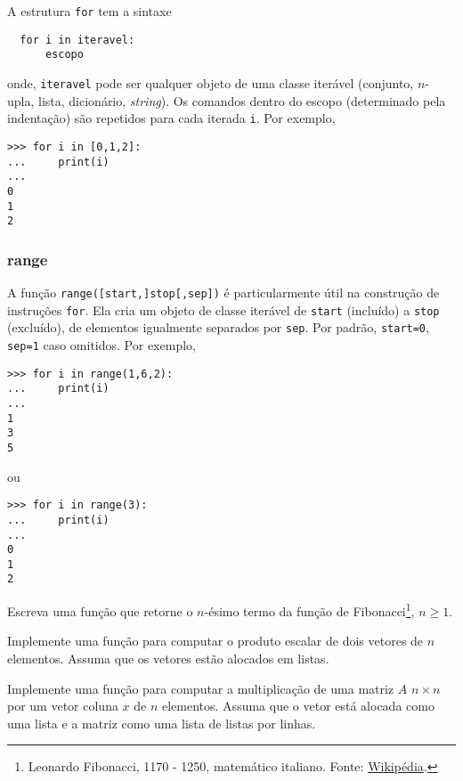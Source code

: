 \documentclass[12pt]{article}
\begin{document}
A estrutura \lstinline+for+ tem a sintaxe
\begin{lstlisting}
  for i in iteravel:
      escopo
\end{lstlisting}
onde, \lstinline+iteravel+ pode ser qualquer objeto de uma classe iterável (conjunto, $n$-upla, lista, dicionário, {\it string}). Os comandos dentro do escopo (determinado pela indentação) são repetidos para cada iterada \lstinline+i+. Por exemplo,
\begin{lstlisting}
>>> for i in [0,1,2]:
...     print(i)
... 
0
1
2
\end{lstlisting}

\subsubsection{range}

A função {\python} \lstinline+range([start,]stop[,sep])+ é particularmente útil na construção de instruções \lstinline+for+. Ela cria um objeto de classe iterável de \lstinline+start+ (incluído) a \lstinline+stop+ (excluído), de elementos igualmente separados por \lstinline+sep+. Por padrão, \lstinline+start=0+, \lstinline+sep=1+ caso omitidos. Por exemplo,
\begin{lstlisting}
>>> for i in range(1,6,2):
...     print(i)
... 
1
3
5
\end{lstlisting}
ou
\begin{lstlisting}
>>> for i in range(3):
...     print(i)
... 
0
1
2
\end{lstlisting}

\begin{exr}
  Escreva uma função que retorne o $n$-ésimo termo da função de Fibonacci\footnote{Leonardo Fibonacci, 1170 - 1250, matemático italiano. Fonte: \href{https://pt.wikipedia.org/wiki/Leonardo\_Fibonacci}{Wikipédia}.}, $n\geq 1$. 
\end{exr}

\begin{exr}
  Implemente uma função para computar o produto escalar de dois vetores de $n$ elementos. Assuma que os vetores estão alocados em listas.
\end{exr}

\begin{exr}
  Implemente uma função para computar a multiplicação de uma matriz $A$ $n\times n$ por um vetor coluna $x$ de $n$ elementos. Assuma que o vetor está alocada como uma lista e a matriz como uma lista de listas por linhas.
\end{exr}
\end{document}
